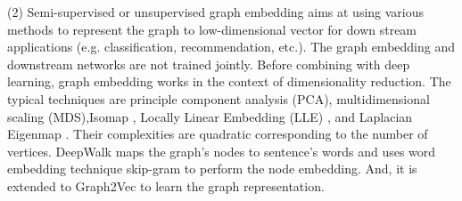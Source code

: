 \documentclass{article}
\begin{document}
(2) Semi-supervised or unsupervised graph embedding aims at using various methods to represent the graph to low-dimensional vector for down stream applications (e.g. classification, recommendation, etc.). The graph embedding and downstream networks are not trained jointly.
Before combining with deep learning, graph embedding works in the context of dimensionality reduction.
The typical techniques are principle component analysis (PCA), multidimensional scaling (MDS),Isomap \cite{Isomap}, Locally Linear Embedding (LLE) \cite{Roweis2323}, and Laplacian Eigenmap \cite{NIPS2001_1961}. Their complexities are quadratic corresponding to the number of vertices. DeepWalk \cite{DBLP:journals/corr/PerozziAS14} maps the graph's nodes to sentence's words and uses word embedding technique skip-gram \cite{DBLP:journals/corr/MikolovSCCD13} to perform the node embedding. And, it is extended to Graph2Vec \cite{DBLP:journals/corr/NarayananCVCLJ17} to learn the graph representation.
%
%
%
%
%
%
%
%

\end{document}
